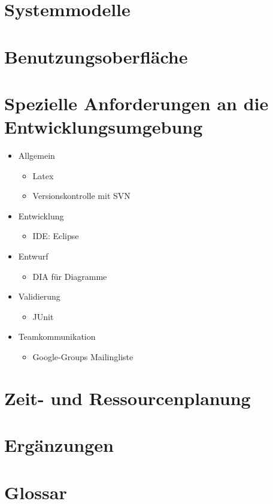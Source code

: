 \documentclass[10pt,a4paper]{article}
\begin{document}
\section{Systemmodelle}

\section{Benutzungsoberfläche}

\section{Spezielle Anforderungen an die Entwicklungsumgebung}
\begin{itemize}
	\item Allgemein
	\begin{itemize}
		\item Latex
		\item Versionskontrolle mit SVN
	\end{itemize}
	\item Entwicklung
	\begin{itemize}
		\item IDE: Eclipse
	\end{itemize}
	\item Entwurf
	\begin{itemize}
		\item DIA für Diagramme
	\end{itemize}
	\item Validierung
	\begin{itemize}
		\item JUnit
	\end{itemize}
	\item Teamkommunikation
	\begin{itemize}
		\item Google-Groups Mailingliste
	\end{itemize}
\end{itemize}

\section{Zeit- und Ressourcenplanung}

\section{Ergänzungen}

\section{Glossar}
\end{document}
